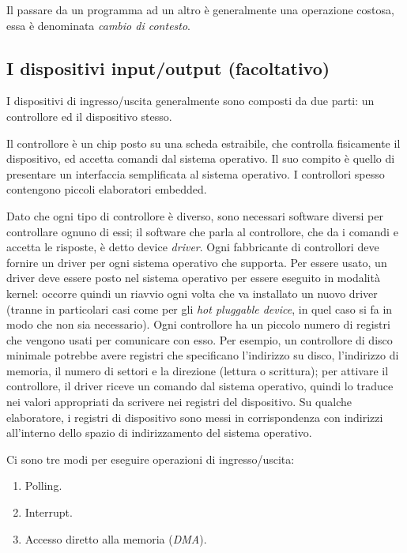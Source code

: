 Il passare da un programma ad un altro è generalmente una operazione costosa, essa è denominata \textit{cambio di contesto}.

\subsection{I dispositivi input/output (facoltativo)}

I dispositivi di ingresso/uscita generalmente sono composti da due parti: un controllore ed il dispositivo stesso.

Il controllore è un chip posto su una scheda estraibile, che controlla fisicamente il dispositivo, ed accetta comandi dal sistema operativo. Il suo compito è quello di presentare un interfaccia semplificata al sistema operativo. I controllori spesso contengono piccoli elaboratori embedded.

Dato che ogni tipo di controllore è diverso, sono necessari software diversi per controllare ognuno di essi; il software che parla al controllore, che da i comandi e accetta le risposte, è detto device \textit{driver}. Ogni fabbricante di controllori deve fornire un driver per ogni sistema operativo che supporta. Per essere usato, un driver deve essere posto nel sistema operativo per essere eseguito in modalità kernel: occorre quindi un riavvio ogni volta che va installato un nuovo driver (tranne in particolari casi come per gli \textit{hot pluggable device}, in quel caso si fa in modo che non sia necessario). Ogni controllore ha un piccolo numero di registri che vengono usati per comunicare con esso. Per esempio, un controllore di disco minimale potrebbe avere registri che specificano l'indirizzo su disco, l'indirizzo di memoria, il numero di settori e la direzione (lettura o scrittura); per attivare il controllore, il driver riceve un comando dal sistema operativo, quindi lo traduce nei valori appropriati da scrivere nei registri del dispositivo.
Su qualche elaboratore, i registri di dispositivo sono messi in corrispondenza con indirizzi all'interno dello spazio di indirizzamento del sistema operativo.

Ci sono tre modi per eseguire operazioni di ingresso/uscita:
\begin{enumerate}
    \item Polling.
    \item Interrupt.
    \item Accesso diretto alla memoria (\textit{DMA}).
\end{enumerate}

